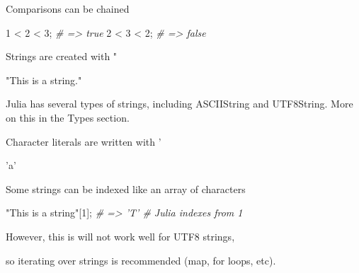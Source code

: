 \documentclass[ignorenonframetext,]{beamer}
\newenvironment{Shaded}{}{}
\newcommand{\FloatTok}[1]{\textcolor[rgb]{0.25,0.63,0.44}{{#1}}}
\newcommand{\CharTok}[1]{\textcolor[rgb]{0.25,0.44,0.63}{{#1}}}
\newcommand{\StringTok}[1]{\textcolor[rgb]{0.25,0.44,0.63}{{#1}}}
\newcommand{\CommentTok}[1]{\textcolor[rgb]{0.38,0.63,0.69}{\textit{{#1}}}}
\newcommand{\NormalTok}[1]{{#1}}
\begin{document}
\begin{frame}[fragile]{Comparisons can be chained}

\begin{Shaded}
\begin{Highlighting}[]
\FloatTok{1} \NormalTok{< }\FloatTok{2} \NormalTok{< }\FloatTok{3}\NormalTok{; }\CommentTok{# => true}
\FloatTok{2} \NormalTok{< }\FloatTok{3} \NormalTok{< }\FloatTok{2}\NormalTok{; }\CommentTok{# => false}
\end{Highlighting}
\end{Shaded}

\end{frame}

\begin{frame}[fragile]{Strings are created with "}

\begin{Shaded}
\begin{Highlighting}[]
\StringTok{"This is a string."}
\end{Highlighting}
\end{Shaded}

Julia has several types of strings, including ASCIIString and
UTF8String. More on this in the Types section.

\begin{block}{Character literals are written with '}

\begin{Shaded}
\begin{Highlighting}[]
\CharTok{'a'}
\end{Highlighting}
\end{Shaded}

\end{block}

\begin{block}{Some strings can be indexed like an array of characters}

\begin{Shaded}
\begin{Highlighting}[]
\StringTok{"This is a string"}\NormalTok{[}\FloatTok{1}\NormalTok{]; }\CommentTok{# => 'T' # Julia indexes from 1}
\end{Highlighting}
\end{Shaded}

\end{block}

\begin{block}{However, this is will not work well for UTF8 strings,}

so iterating over strings is recommended (map, for loops, etc).

\end{block}

\end{frame}
\end{document}
